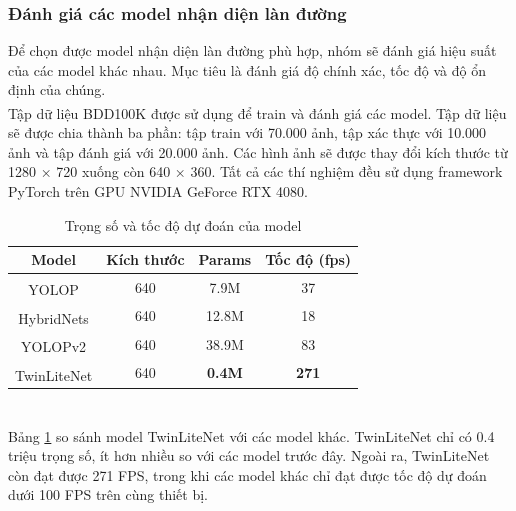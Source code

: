 \subsubsection{Đánh giá các model nhận diện làn đường}
Để chọn được model nhận diện làn đường phù hợp, nhóm sẽ đánh giá hiệu suất của các model khác nhau. Mục tiêu là đánh giá độ chính xác, tốc độ và độ ổn định của chúng.\\
\noindent Tập dữ liệu BDD100K\textsuperscript{\cite{bdd100k}} được sử dụng để train và đánh giá các model. Tập dữ liệu sẽ được chia thành ba phần: tập train với 70.000 ảnh, tập xác thực với 10.000 ảnh và tập đánh giá với 20.000 ảnh. Các hình ảnh sẽ được thay đổi kích thước từ 1280 × 720 xuống còn 640 × 360. Tất cả các thí nghiệm đều sử dụng framework PyTorch trên GPU NVIDIA GeForce RTX 4080.\\
\begin{table}[!hbt]
\begin{center}
\begin{tabular}{@{}cccc@{}}
\toprule
\textbf{Model} & \textbf{Kích thước} & \textbf{Params} & \textbf{Tốc độ (fps)} \\ \midrule
YOLOP\textsuperscript{\cite{yolop}}          & 640           & 7.9M            & 37                   \\
HybridNets\textsuperscript{\cite{hybridnets}}     & 640           & 12.8M           & 18                   \\
YOLOPv2\textsuperscript{\cite{yolopv2}}        & 640           & 38.9M           & 83                   \\ \midrule
TwinLiteNet\textsuperscript{\cite{twinlitenet}}    & 640           & \textbf{0.4M}   & \textbf{271}         \\ \bottomrule
\end{tabular}
\caption{\label{param-fps-table}Trọng số và tốc độ dự đoán của model}
\end{center}
\end{table}\\
Bảng \ref{param-fps-table} so sánh model TwinLiteNet \textsuperscript{\cite{twinlitenet}} với các model khác. TwinLiteNet chỉ có 0.4 triệu trọng số, ít hơn nhiều so với các model trước đây. Ngoài ra, TwinLiteNet còn đạt được 271 FPS, trong khi các model khác chỉ đạt được tốc độ dự đoán dưới 100 FPS trên cùng thiết bị.\\
